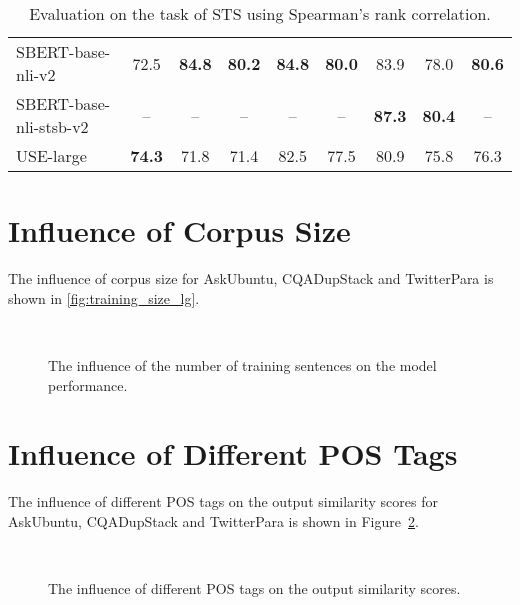 \documentclass[11pt]{article}
\begin{document}
\begin{table}[H]
{\begin{tabular}{|l|c|c|c|c|c|c|c|c|}
\hline
SBERT-base-nli-v2 & 72.5 & \textbf{84.8} & \textbf{80.2} & \textbf{84.8} & \textbf{80.0} & 83.9 & 78.0 & \textbf{80.6} \\
SBERT-base-nli-stsb-v2 & -- & -- & -- & -- & -- & \textbf{87.3} & \textbf{80.4} & -- \\
USE-large      & \textbf{{74.3}}  & 71.8                   & 71.4                   & 82.5                   & 77.5                   & 80.9                   & {{75.8}}  & 76.3                    \\
\hline
\end{tabular}}
\caption{Evaluation on the task of STS using Spearman's rank correlation.}
\label{tbl:sts_spearman}
\end{table}



\section{Influence of Corpus Size}
\label{sec:training_size_lg}
The influence of corpus size for AskUbuntu, CQADupStack and TwitterPara is shown in \autoref{fig:training_size_lg}.

\begin{figure}[H]
  \centering
  \quad\quad
   \\
  \quad\quad
  \caption{The influence of the number of training sentences on the model performance.}
  \label{fig:training_size_lg}
\end{figure}

\section{Influence of Different POS Tags}
\label{sec:pos_tags}
The influence of different POS tags on the output similarity scores for AskUbuntu, CQADupStack and TwitterPara is shown in Figure~\ref{fig:pos_tags_influence}.

\begin{figure}[H]
  \centering
   \\
  \caption{The influence of different POS tags on the output similarity scores.}
  \label{fig:pos_tags_influence}
\end{figure}
\end{document}
